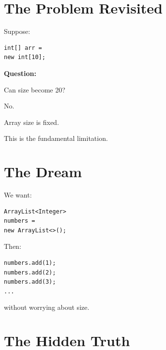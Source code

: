 \documentclass[11pt,a4paper]{book}
\begin{document}
\section{The Problem Revisited}

Suppose:

\begin{verbatim} 
int[] arr =
new int[10];
\end{verbatim}


\textbf{\textbf{Question:}}

Can size become 20?


No.


Array size is fixed.


This is the fundamental limitation.


\section{The Dream}

We want:

\begin{verbatim} 
ArrayList<Integer>
numbers =
new ArrayList<>();
\end{verbatim}


Then:

\begin{verbatim} 
numbers.add(1);
numbers.add(2);
numbers.add(3);
...
\end{verbatim}


without worrying about size.


\section{The Hidden Truth}
\end{document}
